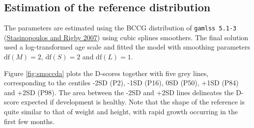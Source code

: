 \documentclass[
]{book}
\begin{document}
\hypertarget{estimation-of-the-reference-distribution}{%
\subsection{Estimation of the reference distribution}\label{estimation-of-the-reference-distribution}}

The parameters are estimated using the BCCG distribution of \texttt{gamlss\ 5.1-3} (\protect\hyperlink{ref-stasinopoulos2007}{Stasinopoulos and Rigby 2007}) using cubic splines smoothers. The final solution used a log-transformed age scale and fitted the model with smoothing parameters \(\mathrm{df}(M)=2\), \(\mathrm{df}(S)=2\) and \(\mathrm{df}(L)=1\).

Figure \ref{fig:smoccda} plots the D-scores together with five grey lines, corresponding to the centiles -2SD (P2), -1SD (P16), 0SD (P50), +1SD (P84) and +2SD (P98). The area between the -2SD and +2SD lines delineates the D-score expected if development is healthy. Note that the shape of the reference is quite similar to that of weight and height, with rapid growth occurring in the first few months.
\end{document}
